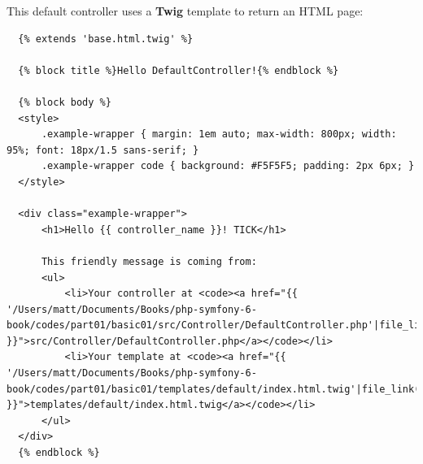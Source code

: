 \documentclass[a4paperpaper,openright]{book}
\newenvironment{Shaded}{}{}
\newcommand{\CommentTok}[1]{\textcolor[rgb]{0.38,0.63,0.69}{\textit{#1}}}
\newcommand{\KeywordTok}[1]{\textcolor[rgb]{0.00,0.44,0.13}{\textbf{#1}}}
\newcommand{\NormalTok}[1]{#1}
\newcommand{\OtherTok}[1]{\textcolor[rgb]{0.00,0.44,0.13}{#1}}
\newcommand{\StringTok}[1]{\textcolor[rgb]{0.25,0.44,0.63}{#1}}
\begin{document}
\begin{Shaded}
\end{Shaded}

This default controller uses a \textbf{Twig} template to return an HTML
page:

\begin{verbatim}
  {% extends 'base.html.twig' %}
  
  {% block title %}Hello DefaultController!{% endblock %}
  
  {% block body %}
  <style>
      .example-wrapper { margin: 1em auto; max-width: 800px; width: 95%; font: 18px/1.5 sans-serif; }
      .example-wrapper code { background: #F5F5F5; padding: 2px 6px; }
  </style>
  
  <div class="example-wrapper">
      <h1>Hello {{ controller_name }}! TICK</h1>
  
      This friendly message is coming from:
      <ul>
          <li>Your controller at <code><a href="{{ '/Users/matt/Documents/Books/php-symfony-6-book/codes/part01/basic01/src/Controller/DefaultController.php'|file_link(0) }}">src/Controller/DefaultController.php</a></code></li>
          <li>Your template at <code><a href="{{ '/Users/matt/Documents/Books/php-symfony-6-book/codes/part01/basic01/templates/default/index.html.twig'|file_link(0) }}">templates/default/index.html.twig</a></code></li>
      </ul>
  </div>
  {% endblock %}
\end{verbatim}
\end{document}
